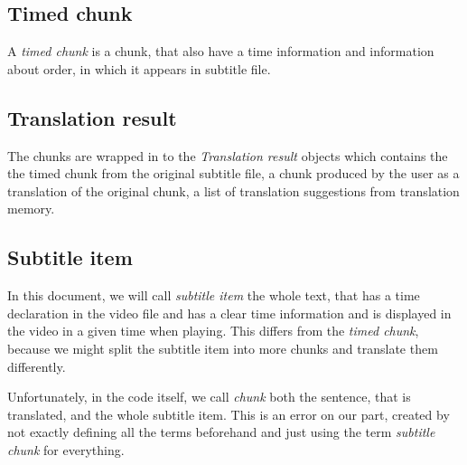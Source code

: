 \subsection*{Timed chunk}
A \emph{timed chunk} is a chunk, that also have a time information and information about order, in which it appears in subtitle file.

\subsection*{Translation result}
The chunks are wrapped in to the \emph{Translation result} objects which contains the the timed chunk from the original subtitle file, a chunk produced by the user as a translation of the original chunk, a list of translation suggestions from translation memory.

\subsection*{Subtitle item}
In this document, we will call \emph{subtitle item} the whole text, that has a time declaration in the video file and has a clear time information and is displayed in the video in a given time when playing. This differs from the \emph{timed chunk}, because we might split the subtitle item into more chunks and translate them differently.

Unfortunately, in the code itself, we call \emph{chunk} both the sentence, that is translated, and the whole subtitle item. This is an error on our part, created by not exactly defining all the terms beforehand and just using the term \emph{subtitle chunk} for everything.
